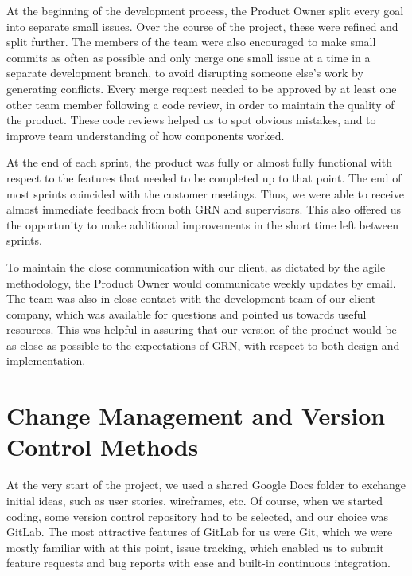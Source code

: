 \documentclass{l3proj}
\begin{document}
 

At the beginning of the development process, the Product Owner split
 every goal into separate small issues. Over the course of the project,
 these were refined and split further. The members of the team were
 also encouraged to make small commits as often as possible and only
 merge one small issue at a time in a separate development branch,
 to avoid disrupting someone else's work by generating conflicts.
 Every merge request needed to be approved by at least one other
 team member following a code review, in order to maintain the quality
 of the product. These code reviews helped us to spot obvious mistakes,
 and to improve team understanding of how components worked.

At the end of each sprint, the product was fully or almost fully
 functional with respect to the features that needed to be completed
 up to that point. The end of most sprints coincided with the customer
 meetings. Thus, we were able to receive almost immediate feedback
 from both GRN and supervisors. This also offered us the opportunity
 to make additional improvements in the short time left between sprints.

To maintain the close communication with our client, as dictated by
 the agile methodology, the Product Owner would communicate weekly
 updates by email. The team was also in close contact with the
 development team of our client company, which was available
 for questions and pointed us towards useful resources. This
 was helpful in assuring that our version of the product would
 be as close as possible to the expectations of GRN, with respect
 to both design and implementation.

\section{Change Management and Version Control Methods}
\label{sec:changemgmt}

At the very start of the project, we used a shared Google Docs folder
 to exchange initial ideas, such as user stories, wireframes, etc.
 Of course, when we started coding, some version control
 repository had to be selected, and our choice was GitLab.
 The most attractive features of GitLab for us were
 Git, which we were mostly familiar with at this point, issue
 tracking, which enabled us to submit feature requests and bug reports
 with ease and built-in continuous integration.
\end{document}

